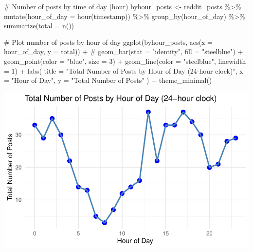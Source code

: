 \documentclass[
  letterpaper,
  DIV=11,
  numbers=noendperiod]{scrartcl}
\newenvironment{Shaded}{\begin{snugshade}}{\end{snugshade}}
\newcommand{\AttributeTok}[1]{\textcolor[rgb]{0.40,0.45,0.13}{#1}}
\newcommand{\CommentTok}[1]{\textcolor[rgb]{0.37,0.37,0.37}{#1}}
\newcommand{\DecValTok}[1]{\textcolor[rgb]{0.68,0.00,0.00}{#1}}
\newcommand{\FunctionTok}[1]{\textcolor[rgb]{0.28,0.35,0.67}{#1}}
\newcommand{\NormalTok}[1]{\textcolor[rgb]{0.00,0.23,0.31}{#1}}
\newcommand{\OtherTok}[1]{\textcolor[rgb]{0.00,0.23,0.31}{#1}}
\newcommand{\SpecialCharTok}[1]{\textcolor[rgb]{0.37,0.37,0.37}{#1}}
\newcommand{\StringTok}[1]{\textcolor[rgb]{0.13,0.47,0.30}{#1}}
\begin{document}
\begin{Shaded}
\begin{Highlighting}[]
\CommentTok{\# Number of posts by time of day (hour)}
\NormalTok{byhour\_posts }\OtherTok{\textless{}{-}}\NormalTok{ reddit\_posts }\SpecialCharTok{\%\textgreater{}\%}
  \FunctionTok{mutate}\NormalTok{(}\AttributeTok{hour\_of\_day =} \FunctionTok{hour}\NormalTok{(timestamp)) }\SpecialCharTok{\%\textgreater{}\%}
  \FunctionTok{group\_by}\NormalTok{(hour\_of\_day) }\SpecialCharTok{\%\textgreater{}\%}
  \FunctionTok{summarize}\NormalTok{(}\AttributeTok{total =} \FunctionTok{n}\NormalTok{())}

\CommentTok{\# Plot number of posts by hour of day}
\FunctionTok{ggplot}\NormalTok{(byhour\_posts, }\FunctionTok{aes}\NormalTok{(}\AttributeTok{x =}\NormalTok{ hour\_of\_day, }\AttributeTok{y =}\NormalTok{ total)) }\SpecialCharTok{+} 
  \CommentTok{\# geom\_bar(stat = "identity", fill = "steelblue") + }
  \FunctionTok{geom\_point}\NormalTok{(}\AttributeTok{color =} \StringTok{"blue"}\NormalTok{, }\AttributeTok{size =} \DecValTok{3}\NormalTok{) }\SpecialCharTok{+}  
  \FunctionTok{geom\_line}\NormalTok{(}\AttributeTok{color =} \StringTok{"steelblue"}\NormalTok{, }\AttributeTok{linewidth =} \DecValTok{1}\NormalTok{) }\SpecialCharTok{+}
  \FunctionTok{labs}\NormalTok{(}
    \AttributeTok{title =} \StringTok{"Total Number of Posts by Hour of Day (24{-}hour clock)"}\NormalTok{,}
    \AttributeTok{x =} \StringTok{"Hour of Day"}\NormalTok{,}
    \AttributeTok{y =} \StringTok{"Total Number of Posts"}
\NormalTok{  ) }\SpecialCharTok{+}
  \FunctionTok{theme\_minimal}\NormalTok{()}
\end{Highlighting}
\end{Shaded}

\includegraphics{Reddit_eda_files/figure-pdf/unnamed-chunk-6-1.pdf}
\end{document}
